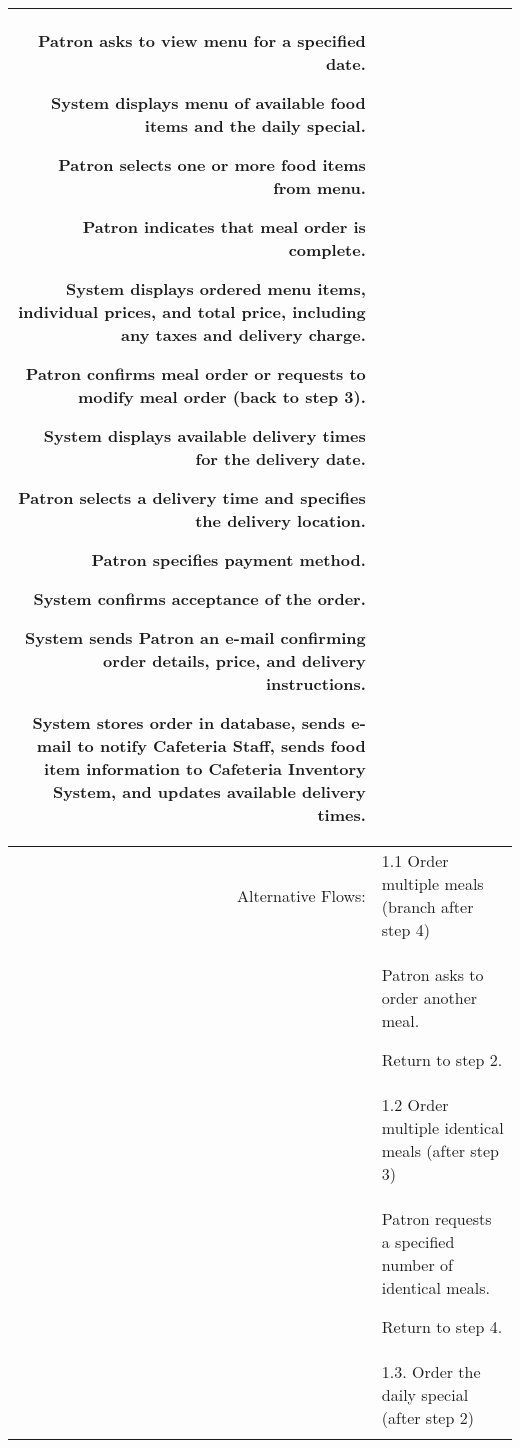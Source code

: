 \documentclass[12pt,oneside,letterpaper]{article}
\newenvironment{packed_enumerate}{ %
\vspace{-7mm}
\begin{enumerate}
  \setlength{\itemsep}{0pt}
  \setlength{\parskip}{0pt}
  \setlength{\parsep}{0pt}
}{\end{enumerate}
\vspace{-8mm}}
\begin{document}
\begin{longtable}{|r|p{3.8in}|}
\begin{packed_enumerate}
\item Patron asks to view menu for a specified date.
\item System displays menu of available food items and the daily special.
\item Patron selects one or more food items from menu.
\item Patron indicates that meal order is complete.
\item System displays ordered menu items, individual prices, and total price, including any taxes and delivery charge.
\item Patron confirms meal order or requests to modify meal order (back to step 3).
\item System displays available delivery times for the delivery date.
\item Patron selects a delivery time and specifies the delivery location.
\item Patron specifies payment method.
\item System confirms acceptance of the order.
\item System sends Patron an e-mail confirming order details, price, and delivery instructions.
\item System stores order in database, sends e-mail to notify Cafeteria Staff, sends food item information to Cafeteria Inventory System, and updates available delivery times.
\end{packed_enumerate}\\
\hline
Alternative Flows:&1.1 Order multiple meals (branch after step 4)\\
&  %
\begin{packed_enumerate}
\item Patron asks to order another meal.
\item Return to step 2.
\end{packed_enumerate}\\
&1.2 Order multiple identical meals (after step 3)\\
&  %
\begin{packed_enumerate}
\item Patron requests a specified number of identical meals.
\item Return to step 4.
\end{packed_enumerate}\\
&1.3. Order the daily special (after step 2)\\
&  %
\begin{packed_enumerate}

\end{packed_enumerate}
\end{longtable}
\end{document}
